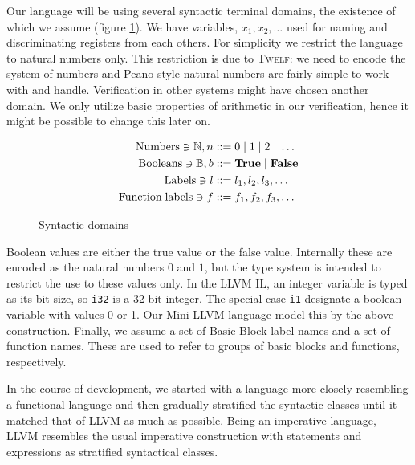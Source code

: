 \documentclass[a4paper, oneside, 10pt, draft]{memoir}
\newcommand{\twelf}{\textsc{Twelf}}
\begin{document}
\newcommand{\numbers}{\mathrm{Numbers}}
\newcommand{\booleans}{\mathrm{Booleans}}
\newcommand{\funlabels}{\mathrm{Function\; labels}}
\newcommand{\nat}{n}
\newcommand{\bool}{b}
\newcommand{\BB}{\mathbb{B}}
\newcommand{\btrue}{\mathbf{True}}
\newcommand{\bfalse}{\mathbf{False}}
\newcommand{\dbundle}{(d_1, d_2, \dotsc, d_m)}
\newcommand{\sbundle}{(\sigma_1, \sigma_2, \dotsc, \sigma_m)}
\newcommand{\bbtypes}{\sbundle}
Our language will be using several syntactic terminal domains, the
existence of which we assume (figure \ref{fig:syntactic-domains}). We
have variables, $x_1, x_2, \dotsc$ used for naming and discriminating
registers from each others. For simplicity we restrict the language to
natural numbers only. This restriction is due to \twelf{}: we need to
encode the system of numbers and Peano-style natural numbers are
fairly simple to work with and handle. Verification in other systems
might have chosen another domain. We only utilize basic properties of
arithmetic in our verification, hence it might be possible to change
this later on.
\begin{figure}
  \begin{align*}
    \numbers \ni \NN, \nat & ::= 0 \bor 1 \bor 2 \bor \dotsc\\
    \booleans \ni \BB, \bool & ::= \btrue \bor \bfalse \\
    \BBlabels \ni l & ::= l_1, l_2, l_3, \dotsc \\
    \funlabels \ni f & ::= f_1,f_2,f_3,\dotsc
  \end{align*}
  \caption{Syntactic domains}
  \label{fig:syntactic-domains}
\end{figure}

Boolean values are either the true value or the false
value. Internally these are encoded as the natural numbers $0$ and
$1$, but the type system is intended to restrict the use to these
values only. In the LLVM IL, an integer variable is typed as its
bit-size, so \texttt{i32} is a 32-bit integer. The special case
\texttt{i1} designate a boolean variable with values 0 or 1. Our
Mini-LLVM language model this by the above construction. Finally, we
assume a set of Basic Block label names and a set of function
names. These are used to refer to groups of basic blocks and
functions, respectively.

In the course of development, we started with a language more closely
resembling a functional language and then gradually stratified the
syntactic classes until it matched that of LLVM as much as
possible. Being an imperative language, LLVM resembles the usual
imperative construction with statements and expressions as stratified
syntactical classes.
\end{document}
